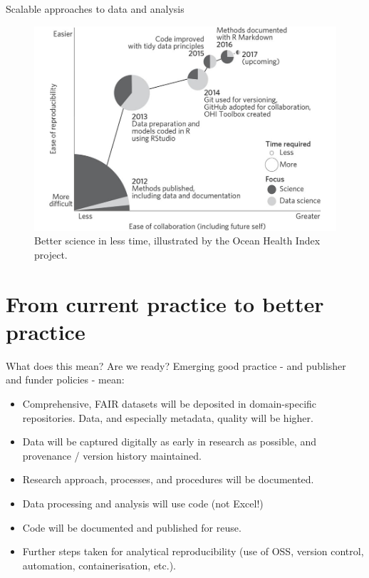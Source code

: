 \documentclass[aspectratio=169, 11pt]{beamer} %
\begin{document}
\begin{frame}{Scalable approaches to data and analysis}
  \begin{figure}[H]
    \centering
        \includegraphics[height=.7\textheight]{figures/Ocean-Health-Index.jpg}
        \caption{Better science in less time, illustrated by the Ocean Health Index project. \cite{Stewart_Lowndes2017-lj}}
        \label{fig:stewart_lowndes}
  \end{figure}
\end{frame}

\section{From current practice to better practice}

\begin{frame}{What does this mean? Are we ready?}
  Emerging good practice - and publisher and funder policies - mean:
    \begin{itemize}[label=\textbullet]
        \item Comprehensive, FAIR datasets will be deposited in domain-specific repositories. Data, and especially metadata, quality will be higher.
        \item Data will be captured digitally as early in research as possible, and provenance / version history maintained.
        \item Research approach, processes, and procedures will be documented.
        \item Data processing and analysis will use code (not Excel!) 
        \item Code will be documented and published for reuse.
        \item Further steps taken for analytical reproducibility (use of OSS, version control, automation, containerisation, etc.). 
    \end{itemize}
\end{frame}
\end{document}
